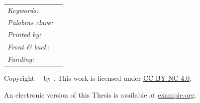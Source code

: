 \documentclass[../main]{subfiles}
\begin{document}
\begin{titlingpage}
\noindent
\begin{tabular}{@{}p{}p{}@{}}
	\textit{Keywords:}       & \thesisKeywords\\[\medskipamount]
	\textit{Palabras clave:} & \foreignlanguage{spanish}{\thesisKeywordsES}\\[\medskipamount]
	\textit{Printed by:}    & \thesisPrintedBy\\[\medskipamount]
	\textit{Front \& back:} & \thesisCoverArt\\[\medskipamount]
	\textit{Funding:}       & \thesisGrants\\
\end{tabular}

\vspace{2\bigskipamount}

\noindent Copyright \textcopyright\ \thesisDate\ by \thesisAuthor. This work is licensed under \href{https://creativecommons.org/licenses/by-nc/4.0/}{CC BY-NC 4.0}.

\medskip
\noindent An electronic version of this Thesis is available at
\href{https://example.org}{example.org}.

\medskip
{}

\end{titlingpage}
\end{document}

